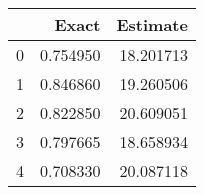 \begin{tabular}{lrr}
\toprule
 & Exact & Estimate \\
\midrule
0 & 0.754950 & 18.201713 \\
1 & 0.846860 & 19.260506 \\
2 & 0.822850 & 20.609051 \\
3 & 0.797665 & 18.658934 \\
4 & 0.708330 & 20.087118 \\
\bottomrule
\end{tabular}
